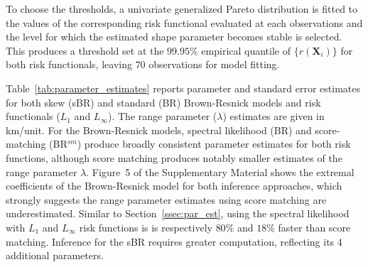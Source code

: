 \documentclass[12pt]{article}
\begin{document}
%
To choose the thresholds, a univariate generalized Pareto distribution is fitted to the values of the corresponding risk functional evaluated at each observations and the level for which the estimated shape parameter becomes stable is selected. 
%
This produces a threshold set at the $99.95\%$ empirical quantile of $\{r(\bm X_i)\}$
for both 
risk functionals, leaving $70$ 
observations for model fitting. 
%
% 

Table~\ref{tab:parameter_estimates} reports parameter and 
standard error estimates for both skew (sBR) and standard (BR) Brown-Resnick models
and risk functionals ($L_1$ and $L_\infty$).
The range parameter ($\lambda$) estimates are given in km/unit.
%
%
For the Brown-Resnick models, spectral likelihood (BR) and score-matching (BR$^{sm}$) produce broadly consistent parameter estimates for both risk functions, although score matching produces notably smaller estimates of the range parameter $\lambda$.
%
Figure~5 of the Supplementary Material shows the extremal coefficients of the Brown-Resnick model for both inference approaches, which strongly suggests the range parameter estimates using score matching are underestimated.
%
Similar to Section~\ref{ssec:par_est}, 
using the spectral likelihood with $L_1$ and $L_\infty$ risk functions is
is respectively $80\%$ and $18\%$ faster than score matching. 
%
Inference for the sBR requires greater computation, reflecting its $4$ additional parameters. 
\end{document}
